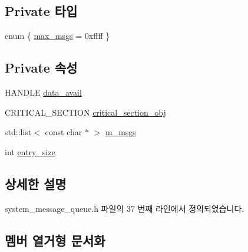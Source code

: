 \subsection*{Private 타입}
\begin{DoxyCompactItemize}
\item 
enum \{ \hyperlink{classavdecc__lib_1_1system__message__queue_a99fb83031ce9923c84392b4e92f956b5a8e6692d9d9b5888ed5eea98c09102350}{max\+\_\+msgs} = 0xffff
 \}
\end{DoxyCompactItemize}
\subsection*{Private 속성}
\begin{DoxyCompactItemize}
\item 
H\+A\+N\+D\+LE \hyperlink{classavdecc__lib_1_1system__message__queue_a94538cc7ead72cb3b5f43d12f42ec148}{data\+\_\+avail}
\item 
C\+R\+I\+T\+I\+C\+A\+L\+\_\+\+S\+E\+C\+T\+I\+ON \hyperlink{classavdecc__lib_1_1system__message__queue_a65b2934c2b713ce4a6d60ea70853e5c3}{critical\+\_\+section\+\_\+obj}
\item 
std\+::list$<$ const char $\ast$ $>$ \hyperlink{classavdecc__lib_1_1system__message__queue_ac4b819207076184ff8d43af789b8cadb}{m\+\_\+msgs}
\item 
int \hyperlink{classavdecc__lib_1_1system__message__queue_a85b70ab9a21d34366075fd47dc59f555}{entry\+\_\+size}
\end{DoxyCompactItemize}


\subsection{상세한 설명}


system\+\_\+message\+\_\+queue.\+h 파일의 37 번째 라인에서 정의되었습니다.



\subsection{멤버 열거형 문서화}
